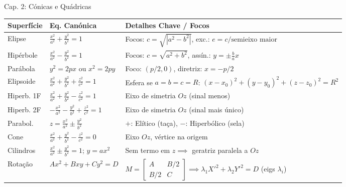 \documentclass[11pt,a4paper]{article}
\begin{document}
\begin{definitionbox}[breakable, left=4pt, right=4pt, top=4pt, bottom=4pt, boxrule=0.6pt, colframe=secondaryColor]{Cap. 2: Cónicas e Quádricas}
  \def\arraystretch{1.2}
  \begin{tabular}{|p{2.2cm}|p{4.2cm}|p{10.2cm}|}
    \hline
    \textbf{Superfície} & \textbf{Eq. Canónica} & \textbf{Detalhes Chave / Focos} \\ \hline
    Elipse & $\frac{x^2}{a^2} + \frac{y^2}{b^2} = 1$ & Focos: $c = \sqrt{|a^2-b^2|}$, exc.: $e = c/\text{semieixo maior}$ \\ \hline
    Hipérbole & $\frac{x^2}{a^2} - \frac{y^2}{b^2} = 1$ & Focos: $c = \sqrt{a^2+b^2}$, assín.: $y = \pm \frac{b}{a} x$ \\ \hline
    Parábola & $y^2 = 2px$ ou $x^2 = 2py$ & Foco: $(p/2,0)$, diretriz: $x = -p/2$ \\ \hline
    Elipsoide & $\frac{x^2}{a^2} + \frac{y^2}{b^2} + \frac{z^2}{c^2} = 1$ & Esfera se $a=b=c=R$: $(x-x_0)^2+(y-y_0)^2+(z-z_0)^2=R^2$ \\ \hline
    Hiperb. 1F & $\frac{x^2}{a^2} + \frac{y^2}{b^2} - \frac{z^2}{c^2} = 1$ & Eixo de simetria $Oz$ (sinal menos) \\ \hline
    Hiperb. 2F & $-\frac{x^2}{a^2} - \frac{y^2}{b^2} + \frac{z^2}{c^2} = 1$ & Eixo de simetria $Oz$ (sinal mais único) \\ \hline
    Parabol. & $z = \frac{x^2}{a^2} \pm \frac{y^2}{b^2}$ & $+$: Elítico (taça), $-$: Hiperbólico (sela) \\ \hline
    Cone & $\frac{x^2}{a^2} + \frac{y^2}{b^2} - \frac{z^2}{c^2} = 0$ & Eixo $Oz$, vértice na origem \\ \hline
    Cilindros & $\frac{x^2}{a^2} \pm \frac{y^2}{b^2} = 1$; $y = a x^2$ & Sem termo em $z \implies$ geratriz paralela a $Oz$ \\ \hline
    Rotação & $Ax^2 + Bxy + Cy^2 = D$ & $M = \begin{bmatrix} A & B/2 \\ B/2 & C \end{bmatrix} \implies \lambda_1 X'^2 + \lambda_2 Y'^2 = D$ (eigs $\lambda_i$) \\ \hline
  \end{tabular}
\end{definitionbox}
\end{document}
